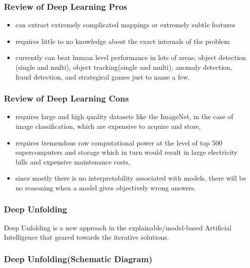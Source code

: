 
\begin{frame}
  \frametitle{Review of Deep Learning Pros}
  \begin{itemize}
    \pause
    \item can extract extremely complicated mappings or extremely subtle features
    \pause
    \item requires little to no knowledge about the exact internals of the problem
    \pause
    \item currently can beat human level performance in lots of areas; object 
    detection (single and multi), object tracking(single and multi), anomaly detection, fraud detection, and strategical games just to name a few.
  \end{itemize}
\end{frame}

\begin{frame}
  \frametitle{Review of Deep Learning Cons}
  \begin{itemize}
    \pause
    \item requires large and high quality datasets like the ImageNet\cite{SVLL}, in the case of image classification, which are expensive to acquire and store,
    \pause
    \item requires tremendous raw computational power at the level of top 500 supercomputers and storage which in turn would result in large electricity bills and expensive maintenance costs,
    \pause
    \item since mostly there is no interpretability associated with models, there will be no reasoning when a model gives objectively wrong answers.
  \end{itemize}
\end{frame}

\begin{frame}
  \frametitle{Deep Unfolding}
  \pause
  Deep Unfolding is a new approach in the explainable/model-based Artificial Intelligence 
  that geared towards the iterative solutions.
\end{frame}

\begin{frame}
  \frametitle{Deep Unfolding(Schematic Diagram)}
  \begin{figure}
    \centering
    \resizebox{1.0\textwidth}{!}{}
    \label{fig:deep_unfolding}
  \end{figure}
\end{frame}

